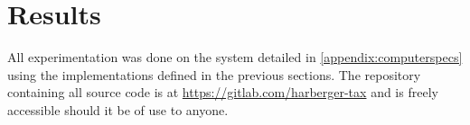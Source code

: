 \chapter{Results}



All experimentation was done on the system detailed in \cref{appendix:computerspecs} using the implementations defined in the previous sections. The repository containing all source code is at \url{https://gitlab.com/harberger-tax} and is freely accessible should it be of use to anyone.







